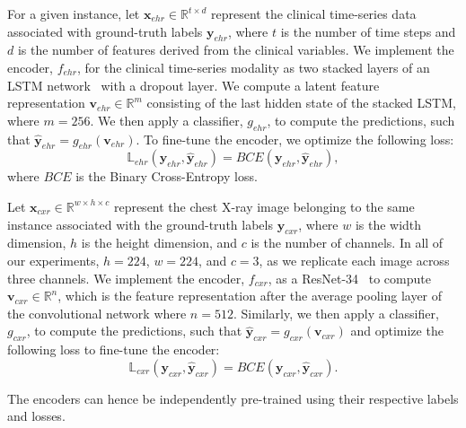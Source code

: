 \documentclass[pmlr]{jmlr}
\begin{document}
For a given instance, let $\mathbf{x}_{ehr}\in \mathbb{R}^{t\times d}$ represent the clinical time-series data associated with ground-truth labels $\textbf{y}_{ehr}$, where $t$ is the number of time steps and $d$ is the number of features derived from the clinical variables. We implement the encoder, $f_{ehr}$, for the clinical time-series modality as two stacked layers of an LSTM network~\citep{hochreiter1997long} with a dropout layer. We compute a latent feature representation $\mathbf{v}_{ehr} \in \mathbb{R}^m$ consisting of the last hidden state of the stacked LSTM, where $m=256$. We then apply a classifier, $g_{ehr}$, to compute the predictions, such that $\hat{\mathbf{y}}_{ehr} = g_{ehr}(\mathbf{v}_{ehr})$. To fine-tune the encoder, we optimize the following loss:
\begin{equation}
    \mathbb{L}_{ehr}(\mathbf{y}_{ehr}, \mathbf{\hat{y}}_{ehr}) = BCE(\mathbf{y}_{ehr}, \mathbf{\hat{y}}_{ehr}),
    \label{eqn:learning_obj_ehr}
\end{equation}
where $BCE$ is the Binary Cross-Entropy loss. 

Let $\mathbf{x}_{cxr} \in \mathbb{R}^{w\times h \times c}$ represent the chest X-ray image belonging to the same instance associated with the ground-truth labels $\textbf{y}_{cxr}$, where $w$ is the width dimension, $h$ is the height dimension, and $c$ is the number of channels. In all of our experiments, $h=224$, $w=224$, and $c=3$, as we replicate each image across three channels. We implement the encoder, $f_{cxr}$, as a ResNet-34~\citep{he2016deep} to compute $\mathbf{v}_{cxr} \in \mathbb{R}^n$, which is the feature representation after the average pooling layer of the convolutional network where $n=512$. Similarly, we then apply a classifier, $g_{cxr}$,  to compute the predictions, such that $\hat{\mathbf{y}}_{cxr} = g_{cxr}(\mathbf{v}_{cxr})$ and optimize the following loss to fine-tune the encoder:
\begin{equation}
    \mathbb{L}_{cxr}(\mathbf{y}_{cxr}, \mathbf{\hat{y}}_{cxr}) = BCE(\mathbf{y}_{cxr}, \mathbf{\hat{y}}_{cxr}). 
    \label{eqn:learning_obj_cxr}
\end{equation}

\noindent The encoders can hence be independently pre-trained using their respective labels and losses.
\end{document}
